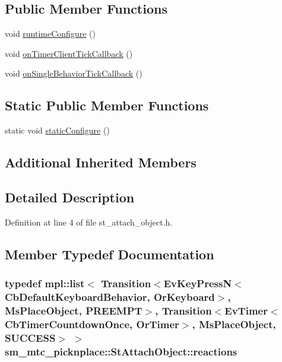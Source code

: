 \subsection*{Public Member Functions}
\begin{DoxyCompactItemize}
\item 
void \hyperlink{structsm__mtc__picknplace_1_1StAttachObject_af622f60515edeb66be26e6e20c7d7838}{runtime\+Configure} ()
\item 
void \hyperlink{structsm__mtc__picknplace_1_1StAttachObject_a24bfe97caf6313a9de2273d3bd5904a3}{on\+Timer\+Client\+Tick\+Callback} ()
\item 
void \hyperlink{structsm__mtc__picknplace_1_1StAttachObject_aeff7f103e4b76187b7283ac531f4fcd3}{on\+Single\+Behavior\+Tick\+Callback} ()
\end{DoxyCompactItemize}
\subsection*{Static Public Member Functions}
\begin{DoxyCompactItemize}
\item 
static void \hyperlink{structsm__mtc__picknplace_1_1StAttachObject_a9602ade3bf3dbd8a5feb45feb8dd0c32}{static\+Configure} ()
\end{DoxyCompactItemize}
\subsection*{Additional Inherited Members}


\subsection{Detailed Description}


Definition at line 4 of file st\+\_\+attach\+\_\+object.\+h.



\subsection{Member Typedef Documentation}
\subsubsection[{\texorpdfstring{reactions}{reactions}}]{\setlength{\rightskip}{0pt plus 5cm}typedef mpl\+::list$<$ Transition$<$Ev\+Key\+PressN$<$Cb\+Default\+Keyboard\+Behavior, {\bf Or\+Keyboard}$>$, {\bf Ms\+Place\+Object}, {\bf P\+R\+E\+E\+M\+PT}$>$, Transition$<$Ev\+Timer$<$Cb\+Timer\+Countdown\+Once, {\bf Or\+Timer}$>$, {\bf Ms\+Place\+Object}, {\bf S\+U\+C\+C\+E\+SS}$>$ $>$ {\bf sm\+\_\+mtc\+\_\+picknplace\+::\+St\+Attach\+Object\+::reactions}}\hypertarget{structsm__mtc__picknplace_1_1StAttachObject_a55a12e8b5e5d5cb138cd0fa3b621865c}{}\label{structsm__mtc__picknplace_1_1StAttachObject_a55a12e8b5e5d5cb138cd0fa3b621865c}


